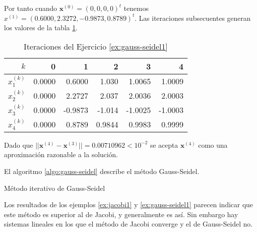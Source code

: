 \begin{exerciseT}
Por tanto cuando $\textbf{x}^{(0)} = (0,0,0,0)^t$ tenemos $x^{(1)} = (0.6000, 2.3272, -0.9873, 0.8789)^t$. Las iteraciones subsecuentes generan los valores
de la tabla \ref{table:gauss-seidel1}.

\begin{table}[H]
	\centering
	\begin{tabular}{r|rrrrr}
		\toprule
		$k$ & 0 & 1 & 2 & 3 & 4 \\\midrule
		$x_1^{(k)}$ & 0.0000 & 0.6000 & 1.030 & 1.0065 & 1.0009 \\
		$x_2^{(k)}$ & 0.0000 & 2.2727 & 2.037 & 2.0036 & 2.0003 \\
		$x_3^{(k)}$ & 0.0000 &-0.9873 &-1.014 &-1.0025 &-1.0003 \\
		$x_4^{(k)}$ & 0.0000 & 0.8789 &0.9844 & 0.9983 & 0.9999 \\
		\bottomrule
	\end{tabular}
	\caption{Iteraciones del Ejercicio \ref{ex:gauss-seidel1}}
    \label{table:gauss-seidel1}
\end{table}  

Dado que $||\textbf{x}^{(4)} - \textbf{x}^{(3)}|| = 0.00710962 < 10^{-2}$ se acepta $\textbf{x}^{(4)}$ como una aproximación razonable a la solución.  
\label{ex:gauss-seidel1}
\end{exerciseT}

El algoritmo \ref{algo:gauss-seidel} describe el método Gauss-Seidel.

\begin{algorithm}[ht]
\caption{Método iterativo de Gauss-Seidel}
\label{algo:gauss-seidel}
\end{algorithm}

Los resultados de los ejemplos \ref{ex:jacobi1} y \ref{ex:gauss-seidel1} parecen indicar que este método es superior al de Jacobi, y generalmente es 
así. Sin embargo hay sistemas lineales en los que el método de Jacobi converge y el de Gauss-Seidel no.

